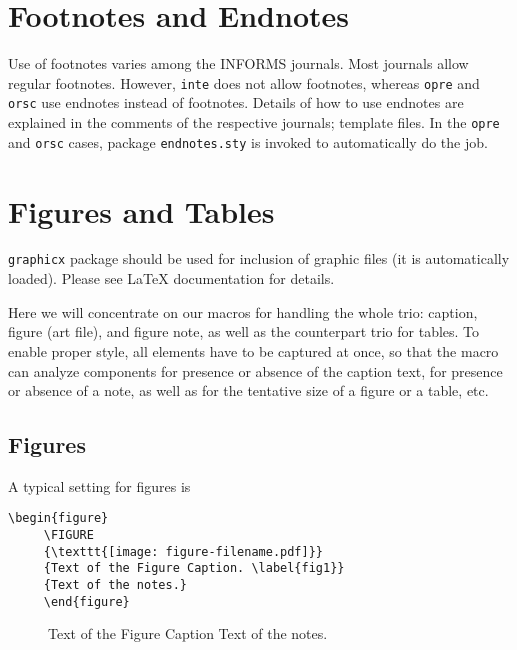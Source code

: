 \documentclass[ijds,nonblindrev]{informs4}
\begin{document}
\section{Footnotes and Endnotes}\label{sec8}

Use of footnotes varies among the INFORMS journals. Most journals allow 
regular footnotes. However, \texttt{inte} does not allow footnotes, 
whereas \texttt{opre} and \texttt{orsc} use endnotes instead of 
footnotes. Details of how to use endnotes are explained in the comments of 
the respective journals; template files. In the \texttt{opre} and
\texttt{orsc} cases, package \texttt{endnotes.sty} is invoked to  
automatically do the job.

\section{Figures and Tables}\label{sec9}

\texttt{graphicx} package should be used for inclusion of graphic files 
(it is automatically loaded). Please see LaTeX documentation for details.

Here we will concentrate on our macros for handling the whole trio: caption, 
figure (art file), and figure note, as well as the counterpart trio for 
tables. To enable proper style, all elements have to be captured at once, so 
that the macro can analyze components for presence or absence of the caption 
text, for presence or absence of a note, as well as for the tentative size 
of a figure or a table, etc.

\subsection{Figures}\label{sec9.1}

A typical setting for figures is

\begin{Verbatim}[fontsize=\small]
     \begin{figure}
     \FIGURE
     {\texttt{[image: figure-filename.pdf]}}
     {Text of the Figure Caption. \label{fig1}}
     {Text of the notes.}
     \end{figure}
\end{Verbatim}

\begin{figure}[!t]%
{{Text of the Figure Caption}\label{fig1}}
{Text of the notes.}
\end{figure}
\end{document}
